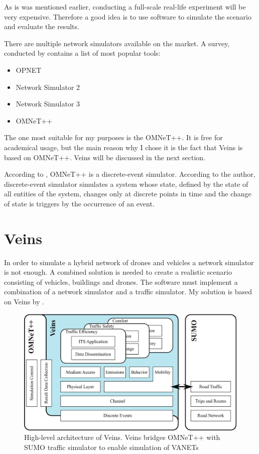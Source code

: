 \documentclass[]{nsm-thesis}
\begin{document}
As is was mentioned earlier, conducting a full-scale real-life experiment will be very expensive. Therefore a good idea is to use software to simulate the scenario and evaluate the results. 

There are multiple network simulators available on the market. A survey, conducted by \textcite{pan2008survey} contains a list of most popular tools:
\begin{itemize}
\item OPNET \cite[Page~5]{pan2008survey}
\item Network Simulator 2 \cite[Page~7]{pan2008survey}
\item Network Simulator 3 \cite[Page~8]{pan2008survey}
\item OMNeT++ \cite[Page~10]{pan2008survey}
\end{itemize}

The one most suitable for my purposes is the OMNeT++. It is free for academical usage, but the main reason why I chose it is the fact that Veins \cite{Sommer2019} is based on OMNeT++. Veins will be discussed in the next section.

According to \textcite[Page~2]{Varga2010}, OMNeT++ is a discrete-event simulator. According to the author, discrete-event simulator simulates a system whose state, defined by the state of all entities of the system, changes only at discrete points in time and the change of state is triggers by the occurrence of an event.

\section {Veins}

In order to simulate a hybrid network of drones and vehicles a network simulator is not enough. A combined solution is needed to create a realistic scenario consisting of vehicles, buildings and drones. The software must implement a combination of a network simulator and a traffic simulator. My solution is based on Veins by \textcite{Sommer2019}.

\begin{figure}
  	\centering
	\includegraphics[width=1\textwidth]{figures/High-level Veins.png}
	\caption{High-level architecture of Veins. Veins bridges OMNeT++ with SUMO traffic simulator to enable simulation of \acp{VANET} \cite{Sommer2019}}
	\label{fig:veinshighlevel}
\end{figure}
\end{document}
